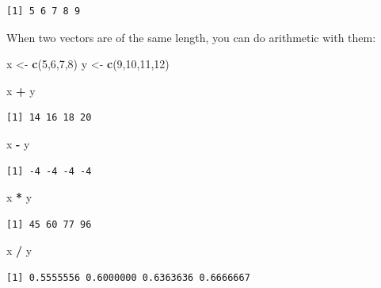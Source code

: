 \documentclass[
]{book}
\newenvironment{Shaded}{\begin{snugshade}}{\end{snugshade}}
\newcommand{\DecValTok}[1]{\textcolor[rgb]{0.00,0.00,0.81}{#1}}
\newcommand{\KeywordTok}[1]{\textcolor[rgb]{0.13,0.29,0.53}{\textbf{#1}}}
\newcommand{\NormalTok}[1]{#1}
\newcommand{\OperatorTok}[1]{\textcolor[rgb]{0.81,0.36,0.00}{\textbf{#1}}}
\newcommand{\StringTok}[1]{\textcolor[rgb]{0.31,0.60,0.02}{#1}}
\begin{document}
\begin{verbatim}
[1] 5 6 7 8 9
\end{verbatim}

When two vectors are of the same length, you can do arithmetic with them:

\begin{Shaded}
\begin{Highlighting}[]
\NormalTok{x <-}\StringTok{ }\KeywordTok{c}\NormalTok{(}\DecValTok{5}\NormalTok{,}\DecValTok{6}\NormalTok{,}\DecValTok{7}\NormalTok{,}\DecValTok{8}\NormalTok{)}
\NormalTok{y <-}\StringTok{ }\KeywordTok{c}\NormalTok{(}\DecValTok{9}\NormalTok{,}\DecValTok{10}\NormalTok{,}\DecValTok{11}\NormalTok{,}\DecValTok{12}\NormalTok{)}

\NormalTok{x }\OperatorTok{+}\StringTok{ }\NormalTok{y}
\end{Highlighting}
\end{Shaded}

\begin{verbatim}
[1] 14 16 18 20
\end{verbatim}

\begin{Shaded}
\begin{Highlighting}[]
\NormalTok{x }\OperatorTok{-}\StringTok{ }\NormalTok{y}
\end{Highlighting}
\end{Shaded}

\begin{verbatim}
[1] -4 -4 -4 -4
\end{verbatim}

\begin{Shaded}
\begin{Highlighting}[]
\NormalTok{x }\OperatorTok{*}\StringTok{ }\NormalTok{y}
\end{Highlighting}
\end{Shaded}

\begin{verbatim}
[1] 45 60 77 96
\end{verbatim}

\begin{Shaded}
\begin{Highlighting}[]
\NormalTok{x }\OperatorTok{/}\StringTok{ }\NormalTok{y}
\end{Highlighting}
\end{Shaded}

\begin{verbatim}
[1] 0.5555556 0.6000000 0.6363636 0.6666667
\end{verbatim}
\end{document}

